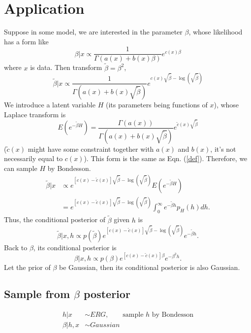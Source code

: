 \documentclass[11pt, oneside]{article}
\begin{document}
\section{Application}
Suppose in some model, we are interested in the parameter $\beta$, whose likelihood has a form like 
\begin{equation}
\beta | x \propto \frac{1}{\Gamma(a(x) + b(x) \beta)}e^{c(x)\beta}
\end{equation}
where $x$ is data. Then transform $\tilde\beta = \beta^2$, 
\begin{equation}
\tilde\beta | x \propto \frac{1}{\Gamma(a(x) + b(x) \sqrt{\tilde\beta})}e^{c(x)\sqrt{\tilde\beta} - \log(\sqrt{\tilde\beta})}
\end{equation}
We introduce a latent variable $H$ (its parameters being functions of $x$), whose Laplace transform is 
\begin{equation}
E(e^{-\tilde \beta H}) = \frac{\Gamma(a(x))}{\Gamma(a(x) + b(x) \sqrt{\tilde\beta})}e^{\tilde c(x)\sqrt{\tilde\beta}}
\end{equation}
($\tilde c(x)$ might have some constraint together with $a(x)$ and $b(x)$, it's not necessarily equal to $c(x)$). This form is the same as  Eqn. (\ref{def}). Therefore, we can sample $H$ by Bondesson.
\begin{align}
\tilde\beta | x &\propto e^{[c(x)-\tilde c(x)]\sqrt{\tilde\beta}- \log\left(\sqrt{\tilde\beta}\right)} E(e^{-\tilde \beta H})\\
&= e^{[c(x)-\tilde c(x)]\sqrt{\tilde\beta}- \log\left(\sqrt{\tilde\beta}\right)} \int_0^\infty e^{-\tilde \beta h} p_H(h) dh.
\end{align}
Thus, the conditional posterior of $\tilde\beta$ given $h$ is 
\begin{equation}
\tilde\beta | x, h \propto p(\tilde \beta) e^{[c(x)-\tilde c(x)]\sqrt{\tilde\beta}- \log\left(\sqrt{\tilde\beta}\right)} e^{-\tilde \beta h}.
\end{equation}
Back to $\beta$, its conditional posterior is 
\begin{equation}
\beta | x, h \propto p( \beta) e^{[c(x)-\tilde c(x)]\beta} e^{-\beta^2 h}.
\end{equation}
Let the prior of $\beta$ be Gaussian, then its conditional posterior is also Gaussian.

\subsection{Sample from $\beta$ posterior}
\begin{align}
h | x &\sim ERG, \qquad \text{sample $h$ by Bondesson}\\
\beta | h, x &\sim Gaussian
\end{align}
\end{document}
